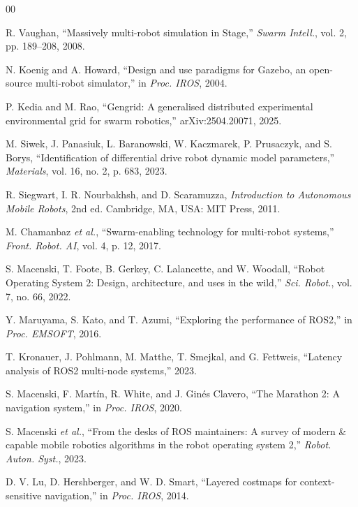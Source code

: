 \documentclass[conference]{IEEEtran}
\begin{document}
\begin{thebibliography}{00}

R. Vaughan,
``Massively multi-robot simulation in Stage,''
\emph{Swarm Intell.}, vol. 2, pp. 189--208, 2008.

N. Koenig and A. Howard,
``Design and use paradigms for Gazebo, an open-source
multi-robot simulator,''
in \emph{Proc. IROS}, 2004.

P. Kedia and M. Rao,
``Gengrid: A generalised distributed experimental
environmental grid for swarm robotics,''
arXiv:2504.20071, 2025.

M. Siwek, J. Panasiuk, L. Baranowski, W. Kaczmarek,
P. Prusaczyk, and S. Borys,
``Identification of differential drive robot dynamic model
parameters,''
\emph{Materials}, vol. 16, no. 2, p. 683, 2023.

R. Siegwart, I. R. Nourbakhsh, and D. Scaramuzza,
\emph{Introduction to Autonomous Mobile Robots}, 2nd ed.
Cambridge, MA, USA: MIT Press, 2011.

M. Chamanbaz \emph{et al.},
``Swarm-enabling technology for multi-robot systems,''
\emph{Front. Robot. AI}, vol. 4, p. 12, 2017.

S. Macenski, T. Foote, B. Gerkey, C. Lalancette, and
W. Woodall,
``Robot Operating System 2: Design, architecture, and uses
in the wild,''
\emph{Sci. Robot.}, vol. 7, no. 66, 2022.

Y. Maruyama, S. Kato, and T. Azumi,
``Exploring the performance of ROS2,''
in \emph{Proc. EMSOFT}, 2016.

T. Kronauer, J. Pohlmann, M. Matthe, T. Smejkal, and
G. Fettweis,
``Latency analysis of ROS2 multi-node systems,'' 2023.

S. Macenski, F. Mart\'in, R. White, and J. Gin\'es Clavero,
``The Marathon 2: A navigation system,''
in \emph{Proc. IROS}, 2020.

S. Macenski \emph{et al.},
``From the desks of ROS maintainers: A survey of modern \&
capable mobile robotics algorithms in the robot operating
system 2,''
\emph{Robot. Auton. Syst.}, 2023.

D. V. Lu, D. Hershberger, and W. D. Smart,
``Layered costmaps for context-sensitive navigation,''
in \emph{Proc. IROS}, 2014.


\end{thebibliography}
\end{document}
